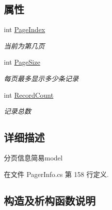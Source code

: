 \subsection*{属性}
\begin{DoxyCompactItemize}
\item 
int \hyperlink{class_x_c_l_net_tools_1_1_entity_1_1_pager_info_simple_a92e66733aad9fb09cec9df1fdb39beb2}{Page\+Index}
\begin{DoxyCompactList}\small\item\em 当前为第几页 \end{DoxyCompactList}\item 
int \hyperlink{class_x_c_l_net_tools_1_1_entity_1_1_pager_info_simple_a3a8883f09f14d322edc5e8be13f75cb6}{Page\+Size}
\begin{DoxyCompactList}\small\item\em 每页最多显示多少条记录 \end{DoxyCompactList}\item 
int \hyperlink{class_x_c_l_net_tools_1_1_entity_1_1_pager_info_simple_abe1bab597cad994b4515208cbb77f0bf}{Record\+Count}
\begin{DoxyCompactList}\small\item\em 记录总数 \end{DoxyCompactList}\end{DoxyCompactItemize}


\subsection{详细描述}
分页信息简易model 



在文件 Pager\+Info.\+cs 第 158 行定义.



\subsection{构造及析构函数说明}
